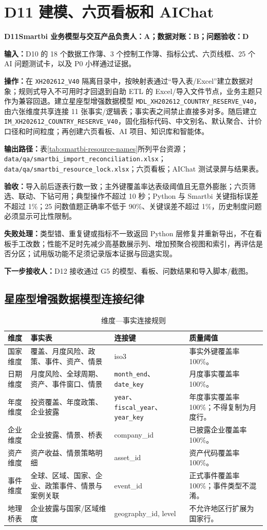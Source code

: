 \documentclass[UTF8,fontset=windows,12pt,openany]{ctexbook}
\newcommand{\Field}[1]{{\small\nolinkurl{#1}}}
\newcommand{\File}[1]{{\small\nolinkurl{#1}}}
\newcommand{\StepTitle}[3]{%
  \noindent\colorbox{DeepNavy}{\parbox{0.965\textwidth}{\color{white}\Large\bfseries #1\quad #2\hfill\normalsize #3}}\par\medskip
}
\newcommand{\CardRow}[2]{\noindent\textbf{#1：}#2\par}
\begin{document}
\section{D11 建模、六页看板和 AIChat}
\StepTitle{D11}{Smartbi 业务模型与交互产品}{负责人：A；数据对账：B；问题验收：D}
\CardRow{输入}{D10 的 18 个数据工作簿、3 个控制工作簿、指标公式、六页线框、25 个 AI 问题测试卡，以及 P0 小样通过证据。}
\CardRow{操作}{在 \Field{XH202612_V40} 隔离目录中，按映射表通过“导入表/Excel”建立数据对象；规则式导入不可用时才回退到自助 ETL 的 Excel/导入文件节点，业务主题只作为兼容回退。建立星座型增强数据模型 \Field{MDL_XH202612_COUNTRY_RESERVE_V40}，由六张维度共享连接 11 张事实/逻辑表；事实表之间禁止直接多对多。随后建立 \Field{IM_XH202612_COUNTRY_RESERVE_V40}，固化指标代码、中文别名、默认聚合、计价口径和时间粒度；再创建六页看板、AI 项目、知识库和智能体。}
\CardRow{输出路径}{表\ref{tab:smartbi-resource-names}所列平台资源；\File{data/qa/smartbi_import_reconciliation.xlsx}；\File{data/qa/smartbi_resource_lock.xlsx}；六页看板；AIChat 测试录屏与结果表。}
\CardRow{验收}{导入前后逐表行数一致；主外键覆盖率达表级阈值且无意外膨胀；六页筛选、联动、下钻可用；典型操作不超过 10 秒；Python 与 Smartbi 关键指标误差不超过 1\%；25 问数值题正确率不低于 90\%、关键误差不超过 1\%，历史制度问题必须显示可比性限制。}
\CardRow{失败处理}{类型错、重复键或指标不一致返回 Python 层修复并重新导出，不在看板手工改数；性能不足时先减少高基数展示列、增加预聚合视图和索引，再评估是否分区；试用版功能不足须记录版本证据与回退实现。}
\CardRow{下一步接收人}{D12 接收通过 G5 的模型、看板、问数结果和导入脚本/截图。}

\subsection{星座型增强数据模型连接纪律}

\begin{longtable}{p{3.8cm}p{3.2cm}p{3.3cm}p{3.1cm}}
\caption{维度—事实连接规则}\label{tab:model-joins}\\
\toprule
\textbf{维度} & \textbf{事实表} & \textbf{连接键} & \textbf{质量阈值}\\
\midrule
国家维度 & 覆盖、月度风险、政策、事件、资产、情景 & iso3 & 事实外键覆盖率 100\%。\\
日期维度 & 月度风险、全球周期、资产、事件窗口、情景 & \Field{month_end}、\Field{date_key} & 月度事实覆盖率 100\%。\\
年度维度 & 投资覆盖、年度政策、企业披露 & \Field{year}、\Field{fiscal_year}、\Field{year_key} & 年度事实覆盖率 100\%；不得复制为月度行。\\
企业维度 & 企业披露、情景、桥表 & company\_id & 已披露企业覆盖率 100\%。\\
资产维度 & 资产收益、情景策略明细 & asset\_id & 资产代码覆盖率 100\%。\\
事件维度 & 全球、区域、国家、企业、政策事件、情景与案例关联 & event\_id & 正式事件覆盖率 100\%；事件类型不混淆。\\
地理桥表 & 企业披露与国家/区域维度 & geography\_id, level & 不允许地区行扩展为国家行。\\
\bottomrule
\end{longtable}
\end{document}
